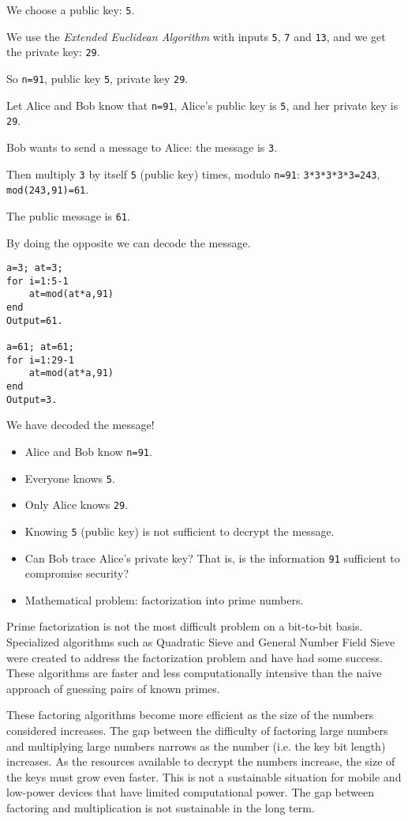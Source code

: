 We choose a public key: \texttt{5}.

We use the \textit{Extended Euclidean Algorithm} with inputs \texttt{5}, \texttt{7} and \texttt{13}, and we get the private key: \texttt{29}.

So \texttt{n=91}, public key \texttt{5}, private key \texttt{29}.

Let Alice and Bob know that \texttt{n=91}, Alice's public key is \texttt{5}, and her private key is \texttt{29}.

Bob wants to send a message to Alice: the message is \texttt{3}.

Then multiply \texttt{3} by itself \texttt{5} (public key) times, modulo \texttt{n=91}: \texttt{3*3*3*3*3=243}, \texttt{mod(243,91)=61}.

The public message is \texttt{61}.

By doing the opposite we can decode the message.

\begin{verbatim}
a=3; at=3;
for i=1:5-1
    at=mod(at*a,91)
end
Output=61.

a=61; at=61;
for i=1:29-1
    at=mod(at*a,91)
end
Output=3.
\end{verbatim}

We have decoded the message!

\begin{itemize}
	\item Alice and Bob know \texttt{n=91}.
	\item Everyone knows \texttt{5}.
	\item Only Alice knows \texttt{29}.
	\item Knowing \texttt{5} (public key) is not sufficient to decrypt the message.
	\item Can Bob trace Alice's private key? That is, is the information \texttt{91} sufficient to compromise security?
	\item Mathematical problem: factorization into prime numbers.
\end{itemize}

Prime factorization is not the most difficult problem on a bit-to-bit basis. Specialized algorithms such as Quadratic Sieve and General Number Field Sieve were created to address the factorization problem and have had some success. These algorithms are faster and less computationally intensive than the naive approach of guessing pairs of known primes.

These factoring algorithms become more efficient as the size of the numbers considered increases. The gap between the difficulty of factoring large numbers and multiplying large numbers narrows as the number (i.e. the key bit length) increases. As the resources available to decrypt the numbers increase, the size of the keys must grow even faster. This is not a sustainable situation for mobile and low-power devices that have limited computational power. The gap between factoring and multiplication is not sustainable in the long term.

